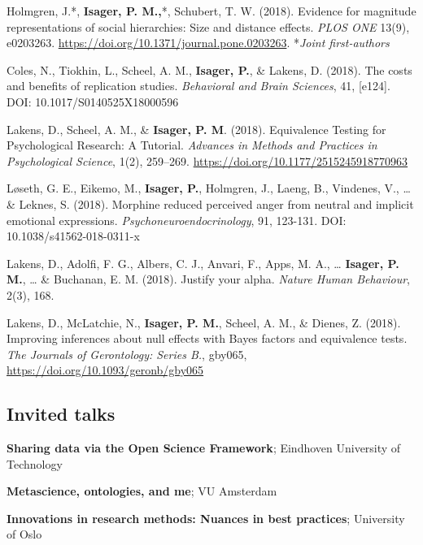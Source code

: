 \documentclass[]{article}
\providecommand{\tightlist}{%
  \setlength{\itemsep}{0pt}\setlength{\parskip}{0pt}}
\begin{document}
Holmgren, J.*, \textbf{Isager, P. M.,}*, Schubert, T. W. (2018).
Evidence for magnitude representations of social hierarchies: Size and
distance effects. \emph{PLOS ONE} 13(9), e0203263.
\url{https://doi.org/10.1371/journal.pone.0203263}. *\emph{Joint
first-authors}

Coles, N., Tiokhin, L., Scheel, A. M., \textbf{Isager, P.}, \& Lakens,
D. (2018). The costs and benefits of replication studies.
\emph{Behavioral and Brain Sciences}, 41, {[}e124{]}. DOI:
10.1017/S0140525X18000596

Lakens, D., Scheel, A. M., \& \textbf{Isager, P. M}. (2018). Equivalence
Testing for Psychological Research: A Tutorial. \emph{Advances in
Methods and Practices in Psychological Science}, 1(2), 259--269.
\url{https://doi.org/10.1177/2515245918770963}

Løseth, G. E., Eikemo, M., \textbf{Isager, P.}, Holmgren, J., Laeng, B.,
Vindenes, V., \ldots{} \& Leknes, S. (2018). Morphine reduced perceived
anger from neutral and implicit emotional expressions.
\emph{Psychoneuroendocrinology}, 91, 123-131. DOI:
10.1038/s41562-018-0311-x

Lakens, D., Adolfi, F. G., Albers, C. J., Anvari, F., Apps, M. A.,
\ldots{} \textbf{Isager, P. M.}, \ldots{} \& Buchanan, E. M. (2018).
Justify your alpha. \emph{Nature Human Behaviour}, 2(3), 168.

Lakens, D., McLatchie, N., \textbf{Isager, P. M.}, Scheel, A. M., \&
Dienes, Z. (2018). Improving inferences about null effects with Bayes
factors and equivalence tests. \emph{The Journals of Gerontology: Series
B.}, gby065, \url{https://doi.org/10.1093/geronb/gby065}

\hypertarget{invited-talks}{%
\subsection{Invited talks}\label{invited-talks}}

\begin{description}
\tightlist
\item[2019]
\textbf{Sharing data via the Open Science Framework}; Eindhoven
University of Technology\\
\item[2018]
\textbf{Metascience, ontologies, and me}; VU Amsterdam\\
\item[2018]
\textbf{Innovations in research methods: Nuances in best practices};
University of Oslo
\end{description}
\end{document}
